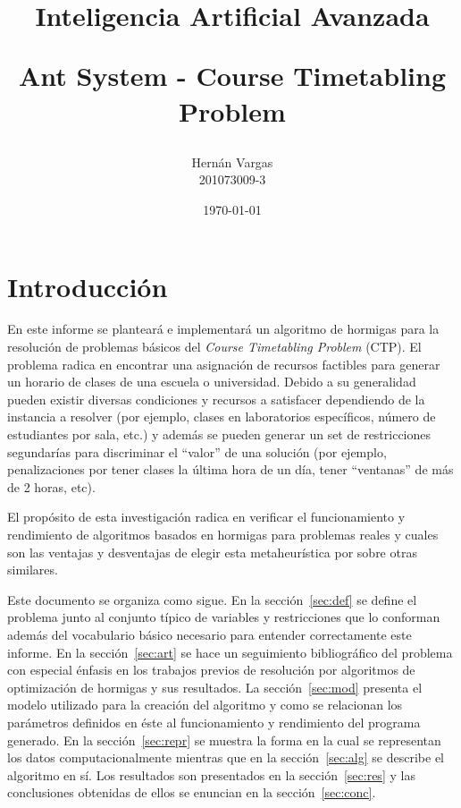 \documentclass[letter, 10pt]{article}
\begin{document}
\title{
  Inteligencia Artificial Avanzada\\ 
  \begin{Large}
    Ant System - Course Timetabling Problem
  \end{Large}
}
\author{Hernán Vargas \\ 201073009-3}
\date{\today}
\maketitle

\begin{abstract}
\end{abstract}

\section{Introducción}\label{sec:intro}
En este informe se planteará e implementará un algoritmo de hormigas para la 
resolución de problemas básicos del \emph{Course Timetabling Problem} (CTP).
El problema radica en encontrar una asignación de recursos factibles para
generar un horario de clases de una escuela o universidad. Debido a su
generalidad pueden existir diversas condiciones y recursos a satisfacer
dependiendo de la instancia a resolver (por ejemplo, clases en laboratorios
específicos, número de estudiantes por sala, etc.) y además se pueden generar
un set de restricciones segundarías para discriminar el ``valor'' de una
solución (por ejemplo, penalizaciones por tener clases la última hora de un día,
tener ``ventanas'' de más de 2 horas, etc).

El propósito de esta investigación radica en verificar el funcionamiento y
rendimiento de algoritmos basados en hormigas para problemas reales y cuales son
las ventajas y desventajas de elegir esta metaheurística por sobre otras 
similares.

Este documento se organiza como sigue. En la sección~\ref{sec:def} se define el
problema junto al conjunto típico de variables y restricciones que lo conforman
además del vocabulario básico necesario para entender correctamente este
informe. 
En la sección~\ref{sec:art} se hace un seguimiento bibliográfico del problema
con especial énfasis en los trabajos previos de resolución por algoritmos de
optimización de hormigas y sus resultados.
La sección~\ref{sec:mod} presenta el modelo utilizado para la creación del
algoritmo y como se relacionan los parámetros definidos en éste al
funcionamiento y rendimiento del programa generado.
En la sección~\ref{sec:repr} se muestra la forma en la cual se representan
los datos computacionalmente mientras que en la sección~\ref{sec:alg} se
describe el algoritmo en sí.
Los resultados son presentados en la sección~\ref{sec:res} y las conclusiones
obtenidas de ellos se enuncian en la sección~\ref{sec:conc}.
\end{document}
